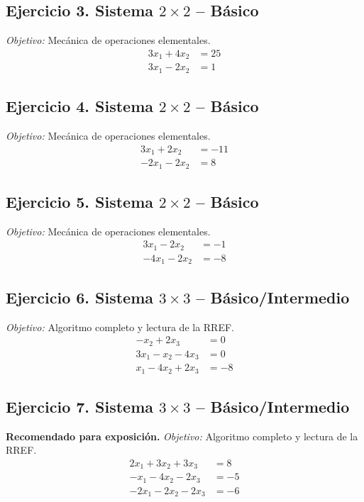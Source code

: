 \documentclass[12pt]{article}
\theoremstyle{remark}
\begin{document}
\subsection*{Ejercicio 3. Sistema $2\times2$ -- Básico}
\emph{Objetivo:} Mecánica de operaciones elementales.
\[
\begin{aligned}
3 x_{1} + 4 x_{2} &= 25\\
3 x_{1} - 2 x_{2} &= 1
\end{aligned}
\]
\subsection*{Ejercicio 4. Sistema $2\times2$ -- Básico}
\emph{Objetivo:} Mecánica de operaciones elementales.
\[
\begin{aligned}
3 x_{1} + 2 x_{2} &= -11\\
- 2 x_{1} - 2 x_{2} &= 8
\end{aligned}
\]
\subsection*{Ejercicio 5. Sistema $2\times2$ -- Básico}
\emph{Objetivo:} Mecánica de operaciones elementales.
\[
\begin{aligned}
3 x_{1} - 2 x_{2} &= -1\\
- 4 x_{1} - 2 x_{2} &= -8
\end{aligned}
\]
\subsection*{Ejercicio 6. Sistema $3\times3$ -- Básico/Intermedio}
\emph{Objetivo:} Algoritmo completo y lectura de la RREF.
\[
\begin{aligned}
- x_{2} + 2 x_{3} &= 0\\
3 x_{1} - x_{2} - 4 x_{3} &= 0\\
x_{1} - 4 x_{2} + 2 x_{3} &= -8
\end{aligned}
\]
\subsection*{Ejercicio 7. Sistema $3\times3$ -- Básico/Intermedio}
\textbf{Recomendado para exposición.} \emph{Objetivo:} Algoritmo completo y lectura de la RREF.
\[
\begin{aligned}
2 x_{1} + 3 x_{2} + 3 x_{3} &= 8\\
- x_{1} - 4 x_{2} - 2 x_{3} &= -5\\
- 2 x_{1} - 2 x_{2} - 2 x_{3} &= -6
\end{aligned}
\]
\end{document}
